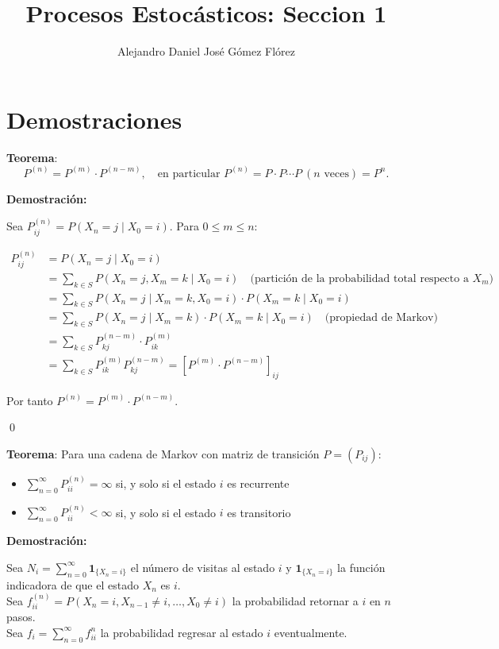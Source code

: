 \documentclass[12pt,a4paper]{article}
\title{Procesos Estocásticos: Seccion 1}
\author{Alejandro Daniel José Gómez Flórez}
\date{}
\newcommand{\teorema}[1]{%
\begin{teoremabox}
\textbf{Teorema}: #1
\end{teoremabox}
}
\begin{document}
\maketitle

\section{Demostraciones}


\teorema{
\begin{equation*}
P^{(n)} = P^{(m)} \cdot P^{(n-m)}, \quad \text{en particular } P^{(n)} = P \cdot P \cdots P \ (\text{$n$ veces}) = P^n.
\end{equation*}}

\textbf{Demostración:}

Sea $P_{ij}^{(n)} = P(X_n = j \mid X_0 = i)$. Para $0 \leq m \leq n$:

\begin{align*}
P_{ij}^{(n)} &= P(X_n = j \mid X_0 = i) \\
&= \sum_{k \in S} P(X_n = j, X_m = k \mid X_0 = i) \quad \text{(partición de la probabilidad total respecto a $X_m$)} \\
&= \sum_{k \in S} P(X_n = j \mid X_m = k, X_0 = i) \cdot P(X_m = k \mid X_0 = i) \\
&= \sum_{k \in S} P(X_n = j \mid X_m = k) \cdot P(X_m = k \mid X_0 = i) \quad \text{(propiedad de Markov)} \\
&= \sum_{k \in S} P_{kj}^{(n-m)} \cdot P_{ik}^{(m)} \\
&= \sum_{k \in S} P_{ik}^{(m)} P_{kj}^{(n-m)} = [P^{(m)} \cdot P^{(n-m)}]_{ij}
\end{align*}

Por tanto $P^{(n)} = P^{(m)} \cdot P^{(n-m)}$.

\qed


\teorema{Para una cadena de Markov con matriz de transición $P = (P_{ij})$:
\begin{itemize}
    \item $\sum_{n=0}^{\infty} P_{ii}^{(n)} = \infty$ si, y solo si el estado $i$ es recurrente
    \item $\sum_{n=0}^{\infty} P_{ii}^{(n)} < \infty$ si, y solo si el estado $i$ es transitorio
\end{itemize}}

\textbf{Demostración:}

Sea $N_i = \sum_{n=0}^{\infty} \mathbf{1}_{\{X_n = i\}}$ el número de visitas al estado $i$ y $\mathbf{1}_{\{X_n = i\}}$ la función indicadora de que el estado $X_n$ es $i$. \\
Sea $f^{(n)}_{ii} = P(X_n = i, X_{n-1} \neq i, \ldots, X_0 \neq i)$ la probabilidad retornar a $i$ en $n$ pasos.\\
Sea $f_{i} = \sum_{n=0}^{\infty} f^{n}_{ii}$ la probabilidad regresar al estado $i$ eventualmente.
\end{document}
